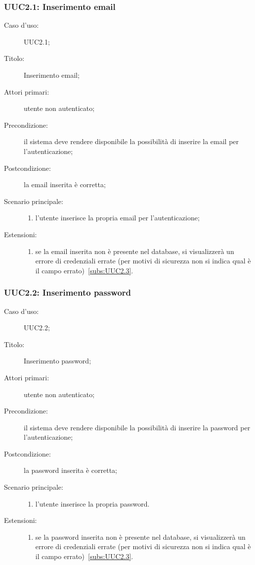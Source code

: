 \documentclass[../../../analisi-dei-requisiti.tex]{subfiles}
\begin{document}
\subsubsection{UUC2.1: Inserimento email}%
\label{subs:UUC2.1}
\begin{description}
  \item[Caso d'uso:] UUC2.1;
  \item[Titolo:] Inserimento email;
  \item[Attori primari:] utente non autenticato;
  \item[Precondizione:] il sistema deve rendere disponibile la possibilità di inserire la email per l'autenticazione;
  \item[Postcondizione:] la email inserita è corretta;
  \item[Scenario principale:]
        \begin{enumerate}
          \item l'utente inserisce la propria email per l'autenticazione;
        \end{enumerate}
  \item[Estensioni:]
        \begin{enumerate}
          \item se la email inserita non è presente nel database, si visualizzerà un errore di credenziali errate (per motivi di sicurezza non si indica qual è il campo errato)~\ref{subs:UUC2.3}.
        \end{enumerate}
\end{description}



\subsubsection{UUC2.2: Inserimento password}%
\label{subs:UUC2.2}
\begin{description}
  \item[Caso d'uso:] UUC2.2;
  \item[Titolo:] Inserimento password;
  \item[Attori primari:] utente non autenticato;
  \item[Precondizione:] il sistema deve rendere disponibile la possibilità di inserire la password per l'autenticazione;
  \item[Postcondizione:] la password inserita è corretta;
  \item[Scenario principale:]
        \begin{enumerate}
          \item l'utente inserisce la propria password.
        \end{enumerate}
  \item[Estensioni:]
        \begin{enumerate}
          \item se la password inserita non è presente nel database, si visualizzerà un errore di credenziali errate (per motivi di sicurezza non si indica qual è il campo errato)~\ref{subs:UUC2.3}.
        \end{enumerate}
\end{description}
\end{document}
